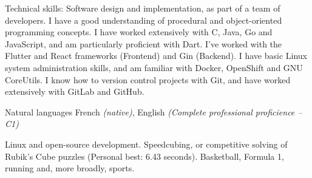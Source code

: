 \documentclass[10pt,a4paper]{article} %
\begin{document}
\spacedhrule{0.5em}{-0.4em} %



\inlineheadsection %
{Technical skills:}
{Software design and implementation, as part of a team of developers. I have a good understanding of procedural and object-oriented programming concepts. I have worked extensively with C, Java, Go and JavaScript, and am particularly proficient with Dart. I've worked with the Flutter and React frameworks (Frontend) and Gin (Backend). I have basic Linux system administration skills, and am familiar with Docker, OpenShift and GNU CoreUtils. I know how to version control projects with Git, and have worked extensively with GitLab and GitHub.}



\inlineheadsection %
{Natural languages}
{French \textit{(native)}, English \textit{(Complete professional proficience -- C1)}}


\spacedhrule{1.6em}{-0.4em} %


{Linux and open-source development. Speedcubing, or competitive solving of Rubik's Cube puzzles (Personal best: 6.43 seconds). Basketball, Formula 1, running and, more broadly, sports.}

\end{document}
